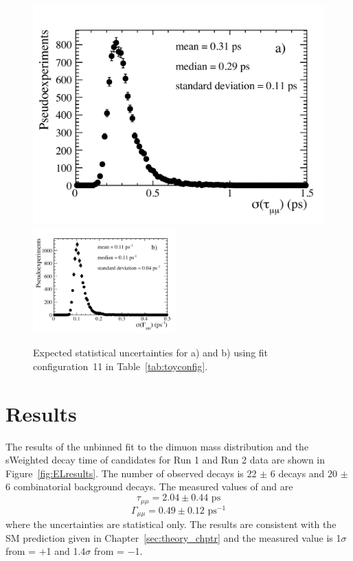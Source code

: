 \begin{figure}[tbp]
    \centering
        \includegraphics[width=0.49 \textwidth]{./Figs/LifetimeMeasurement/5320-6000_tau_err.pdf}
        \includegraphics[width=0.49\textwidth]{./Figs/LifetimeMeasurement/5320-6000_gamma_err.pdf}

    \caption{Expected statistical uncertainties for a) \tmumu and b) \Gmumu using fit configuration~11 in Table~\ref{tab:toyconfig}.}
    \label{fig:exptuncert}
\end{figure}

\clearpage

\section{Results}
\label{sec:ELresults}

The results of the unbinned \ml fit to the dimuon mass distribution and the sWeighted decay time of \bsmumu candidates for Run 1 and Run 2 data are shown in Figure~\ref{fig:ELresults}. The number of observed decays is 22 $\pm$ 6 \bsmumu decays and 20 $\pm$ 6 combinatorial background decays. The measured values of \tmumu and \Gmumu are
\begin{equation}
\tau_{\mu\mu} = 2.04 \pm 0.44  \text{ ps} 
\end{equation}
\begin{equation}
\Gamma_{\mu\mu} = 0.49  \pm 0.12 \text{ ps}^{-1}
\end{equation}
where the uncertainties are statistical only. The results are consistent with the SM prediction given in Chapter~\ref{sec:theory_chptr} and the measured value is 1$\sigma$ from \ADG = +1 and 1.4$\sigma$ from \ADG = $-$1. 


